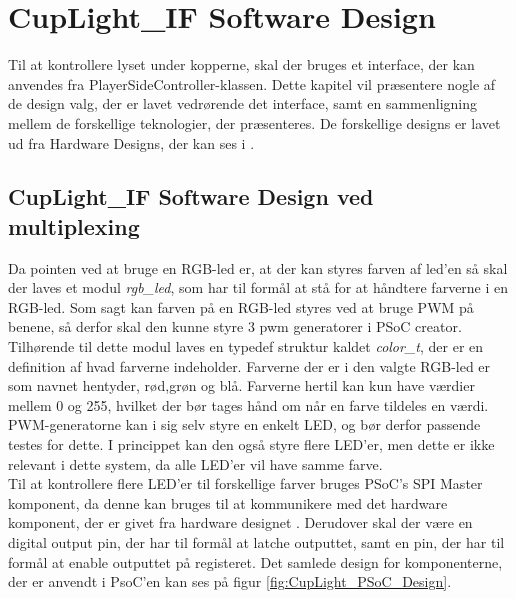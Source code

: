 \documentclass[Softwaredesign/Softwaredesign_main.tex]{subfiles}
\begin{document}
\section{CupLight\_IF Software Design} \label{sec:cuplight_sw_design}
Til at kontrollere lyset under kopperne, skal der bruges et interface, der kan anvendes fra PlayerSideController-klassen. Dette kapitel vil præsentere nogle af de design valg, der er lavet vedrørende det interface, samt en sammenligning mellem de forskellige teknologier, der præsenteres. De forskellige designs er lavet ud fra Hardware Designs, der kan ses i .
\subsection{CupLight\_IF Software Design ved multiplexing}
Da pointen ved at bruge en RGB-led er, at der kan styres farven af led'en så skal der laves  et modul \textit{rgb\_led}, som har til formål at stå for at håndtere farverne i en RGB-led. Som sagt kan farven på en RGB-led styres ved at bruge PWM på benene, så derfor skal den kunne styre 3 pwm generatorer i PSoC creator. Tilhørende til dette modul laves en typedef struktur kaldet \textit{color\_t}, der er en definition af hvad farverne indeholder. Farverne der er i den valgte RGB-led er som navnet hentyder, rød,grøn og blå. Farverne hertil kan kun have værdier mellem 0 og 255, hvilket der bør tages hånd om når en farve tildeles en værdi.
\\ PWM-generatorne kan i sig selv styre en enkelt LED, og bør derfor passende testes for dette. I princippet kan den også styre flere LED'er, men dette er ikke relevant i dette system, da alle LED'er vil have samme farve.
\\Til at kontrollere flere LED'er til forskellige farver bruges PSoC's SPI Master komponent, da denne kan bruges til at kommunikere med det hardware komponent, der er givet fra hardware designet . Derudover skal der være en digital output pin, der har til formål at latche outputtet, samt en pin, der har til formål at enable outputtet på registeret. Det samlede design for komponenterne, der er anvendt i PsoC'en kan ses på figur \ref{fig:CupLight_PSoC_Design}.
\end{document}

